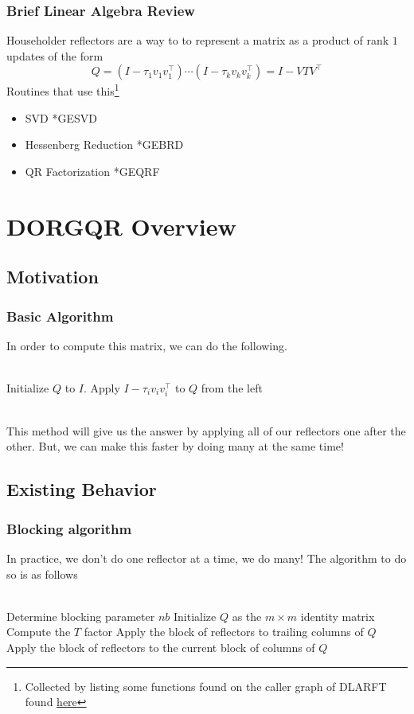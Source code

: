 \documentclass[12pt]{beamer}
\begin{document}
    \begin{frame}
        \frametitle{Brief Linear Algebra Review}
        Householder reflectors are a way to to represent a matrix as a product of rank $1$ updates of the form
        $$
            Q = \left(I - \tau_1 v_1v_1^\top\right)\cdots\left(I - \tau_k v_kv_k^\top\right) = I - VTV^\top
        $$
        Routines that use this\footnote{Collected by listing some functions found on the caller graph of DLARFT found \textcolor{blue}{\href{https://netlib.org/lapack/explore-html//d7/d0d/group__larft_ga20e5a4f351b3ca7d30078547e55884f5_ga20e5a4f351b3ca7d30078547e55884f5_icgraph_org.svg}{here}}}
        \begin{itemize}
            \item SVD *GESVD
            \item Hessenberg Reduction *GEBRD
            \item QR Factorization *GEQRF
        \end{itemize}
    \end{frame}
    \section{DORGQR Overview}
    \subsection{Motivation}
    \begin{frame}
        \frametitle{Basic Algorithm}
            In order to compute this matrix, we can do the following.\\\,\\
        \begin{algorithmic}[1]
            \State Initialize $Q$ to $I$.
            \State Apply $I-\tau_iv_iv_i^\top$ to $Q$ from the left
            \EndFor
        \end{algorithmic}\,\\
        This method will give us the answer by applying all of our reflectors one after the other. But, we can make this 
        faster by doing many at the same time!
    \end{frame}
    \subsection{Existing Behavior}
    \begin{frame}
        \frametitle{Blocking algorithm}
        In practice, we don't do one reflector at a time, we do many! The algorithm to do so is as follows\\\,\\
        \begin{algorithmic}[1]
            \State Determine blocking parameter $nb$
            \State Initialize $Q$ as the $m\times m$ identity matrix
            \State Compute the $T$ factor
            \State Apply the block of reflectors to trailing columns of $Q$
            \State Apply the block of reflectors to the current block of columns of $Q$
            \EndFor
        \end{algorithmic}
    \end{frame}
\end{document}
